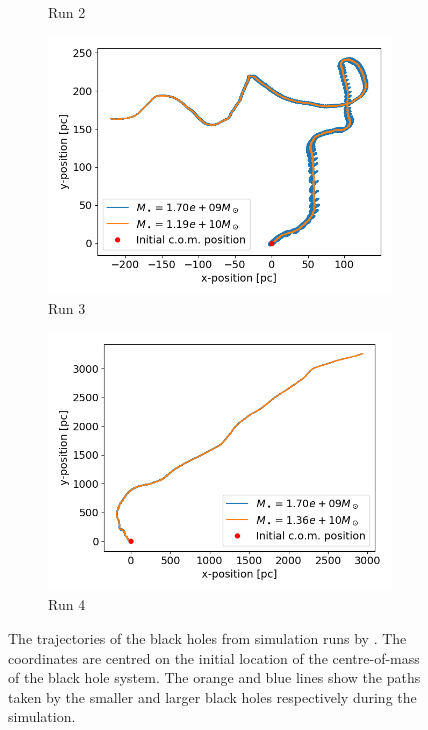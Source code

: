 \documentclass[english, oneside]{HYgradu}
\begin{document}
\begin{figure}
\begin{subfigure}[b]{0.49\textwidth}
		\caption{Run 2}
	\end{subfigure}
	\begin{subfigure}[b]{0.49\textwidth}
		\includegraphics[width=\textwidth]{Run3_Trajectory_small.png}
		\caption{Run 3}
	\end{subfigure}
	\begin{subfigure}[b]{0.49\textwidth}
		\includegraphics[width=\textwidth]{Run4_Trajectory_small.png}
		\caption{Run 4}
	\end{subfigure}
	\caption{The trajectories of the black holes from simulation runs by \cite{Mannerkoski2019}. The coordinates are centred on the initial location of the centre-of-mass of the black hole system. The orange and blue lines show the paths taken by the smaller and larger black holes respectively during the simulation.}
\end{figure}
\end{document}
